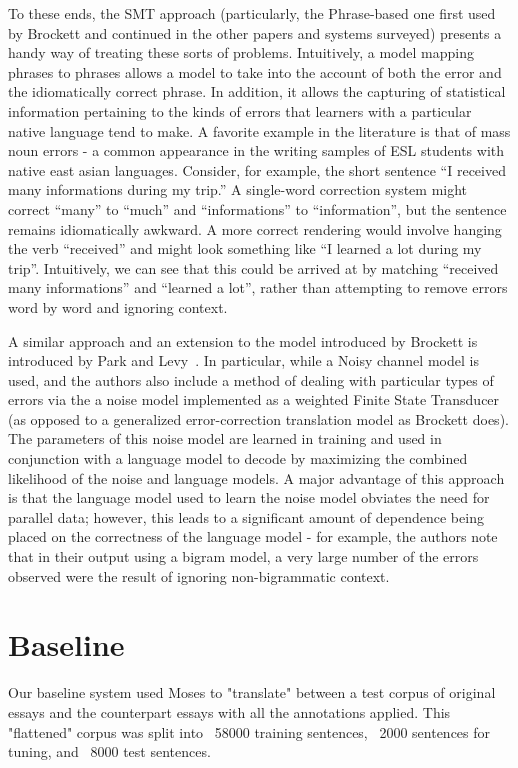 \documentclass[11pt,letterpaper]{article}
\begin{document}
\indent To these ends, the SMT approach (particularly, the Phrase-based one first used by Brockett and continued in the other papers and systems surveyed) presents a handy way of treating these sorts of problems. Intuitively, a model mapping phrases to phrases allows a model to take into the account of both the error and the idiomatically correct 
phrase. In addition, it allows the capturing of statistical information pertaining to the kinds of errors that learners with a particular native language tend to make. A favorite example in the literature is that of mass noun errors - a common appearance in the writing samples of ESL students 
with native east asian languages. Consider, for example, the short sentence “I received many informations during my trip.”  A single-word correction system might correct “many” to “much” and “informations” to “information”, but the sentence remains idiomatically awkward. A more correct rendering would involve hanging the verb “received” and might look something like “I learned a lot during my trip”. Intuitively, we can see that this could be arrived at by matching “received many informations” and “learned a lot”, rather than attempting to remove errors word by word and ignoring context. \newline

\indent A similar approach and an extension to the model introduced by Brockett is introduced by Park and Levy~\cite{park}. 
In particular, while a Noisy channel model is used, and the authors also include a method of dealing with particular 
types of errors via the a noise model implemented as a weighted Finite State Transducer (as opposed 
to a generalized error-correction translation model as Brockett does). The parameters of this noise model 
are learned in training and used in conjunction with a language model to decode by maximizing the combined 
likelihood of the noise and language models. A major advantage of this approach is that the language model 
used to learn the noise model obviates the need for parallel data; however, this leads to a significant 
amount of dependence being placed on the correctness of the language model - for example, the authors note 
that in their output using a bigram model, a very large number of the errors observed were the result of 
ignoring non-bigrammatic context. \newline

\section{Baseline}
Our baseline system used Moses to "translate" between a test corpus of original essays and the counterpart essays with all the annotations applied. This "flattened" corpus was split into ~58000 training sentences, ~2000 sentences for tuning, and ~8000 test sentences. 
\end{document}
